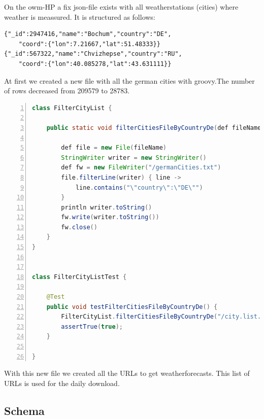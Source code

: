 \documentclass[paper=a4, fontsize=11pt]{article} %
\numberwithin{equation}{section} %
\numberwithin{figure}{section} %
\numberwithin{table}{section} %
\begin{document}
On the owm-HP a fix json-file exists with all weatherstations (cities) where weather is meassured. It is structured as follows:\newline
 \begin{lstlisting}
{"_id":2947416,"name":"Bochum","country":"DE",
	"coord":{"lon":7.21667,"lat":51.48333}}
{"_id":567322,"name":"Chvizhepse","country":"RU",
	"coord":{"lon":40.085278,"lat":43.631111}}
\end{lstlisting}
At first we created a new file with all the german cities with groovy.The number of rows decreased from 209579 to 28783.
\newpage
{}

\begin{lstlisting}[language=java, 		% Setzt die Sprache
	basicstyle=\scriptsize\ttfamily, 	% Setzt den Standardstil
	keywordstyle=\color{red}\bfseries,	% Setzt den Stil für Schlüsselwörter
	identifierstyle=\color{blue},		% Identifier bekommen keine gesonderte formatierung
	commentstyle=\color{DarkGreen},		% Stil für Kommentare
	stringstyle=\ttfamily, 				% Stil für Strings (gekennzeichnet mit "String")
	breaklines=true, 					% Zeilen werden umgebrochen
	numbers=left, 						% Zeilennummern links
	numberstyle=\tiny, 					% Stil für die Seitennummern
	frame=single, 						% Rahmen
	backgroundcolor=\color{myGrey}, 	% Hintergrundfarbe
	caption={groovy-code for cityfilter},	% Caption
	tabsize=2							% Größe der Tabulatoren
	]
class FilterCityList {

	public static void filterCitiesFileByCountryDe(def fileName){

		def file = new File(fileName)
		StringWriter writer = new StringWriter()
		def fw = new FileWriter("/germanCities.txt")
		file.filterLine(writer) { line ->
			line.contains("\"country\":\"DE\"")
		}
		println writer.toString()
		fw.write(writer.toString())
		fw.close()
	}
}


class FilterCityListTest {

	@Test
	public void testFilterCitiesFileByCountryDe() {
		FilterCityList.filterCitiesFileByCountryDe("/city.list.json")
		assertTrue(true);
	}

}
\end{lstlisting}

With this new file we created all the URLs to get weatherforecasts. This list of URLs is used for the daily download.

\subsection{Schema}
\end{document}
